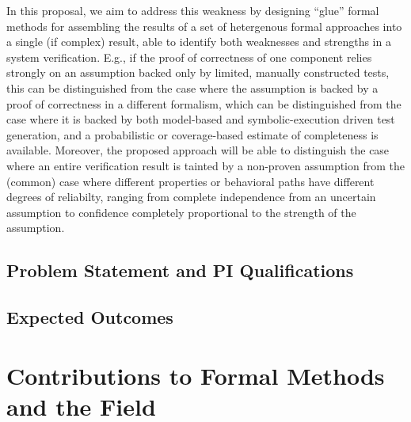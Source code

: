 In this proposal, we aim to address this weakness by designing
``glue'' formal methods for assembling the results of a set of
hetergenous formal approaches into a single (if complex) result, able
to identify both weaknesses and strengths in a system verification.
E.g., if the proof of correctness of one component relies strongly on
an assumption backed only by limited, manually constructed tests, this
can be distinguished from the case where the assumption is backed by a
proof of correctness in a different formalism, which can be
distinguished from the case where it is backed by
both model-based and  symbolic-execution driven test generation, and
a probabilistic or coverage-based estimate of completeness is
available.  Moreover, the proposed approach will be able to distinguish the case
where an entire verification result is tainted by a non-proven
assumption from the (common) case where different properties or
behavioral paths have different degrees of reliabilty, ranging from
complete independence from an uncertain assumption to confidence
completely proportional to the strength of the assumption.


\subsection{Problem Statement and PI Qualifications}

\subsection{Expected Outcomes}

\section{Contributions to Formal Methods and the Field}